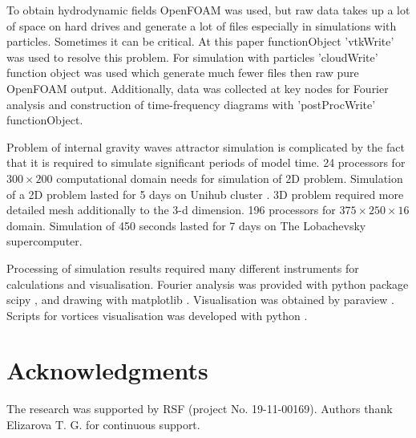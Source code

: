 \documentclass[a4wide,fontsize=12pt]{article}
\begin{document}
To obtain hydrodynamic fields OpenFOAM was used, but raw data takes up a lot of space on hard drives and generate a lot of files especially in simulations with particles. Sometimes it can be critical. At this paper functionObject 'vtkWrite' was used to resolve this problem. For simulation with particles 'cloudWrite' function object was used which generate much fewer files then raw pure OpenFOAM output. Additionally, data was collected at key nodes for Fourier analysis and construction of time-frequency diagrams with 'postProcWrite' functionObject.

Problem of internal gravity waves attractor simulation is complicated by the fact that it is required to simulate significant periods of model time. 24 processors for $300 \times 200$ computational domain needs for simulation of 2D problem. Simulation of a 2D problem lasted for 5 days on Unihub cluster \cite{Unihub2014}. 3D problem required more detailed mesh additionally to the 3-d dimension. 196 processors for $375 \times 250 \times 16$ domain. Simulation of 450 seconds lasted for 7 days on The Lobachevsky supercomputer.

Processing of simulation results required many different instruments for calculations and visualisation.
Fourier analysis was provided with python package scipy \cite{scipy}, and drawing with matplotlib \cite{matplotlib}. Visualisation was obtained by paraview \cite{paraview}. Scripts for vortices visualisation was developed with python \cite{python}. 

\section{Acknowledgments}

The research was supported by RSF (project No. 19-11-00169).
Authors thank Elizarova T. G. for continuous support. 



\end{document}

